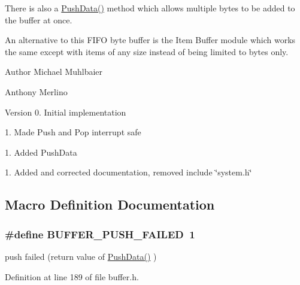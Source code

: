 There is also a \hyperlink{group__buffer_ga1a97e2269e9b21fc61b6e72ffdd2e374}{Push\+Data()} method which allows multiple bytes to be added to the buffer at once.

An alternative to this F\+I\+F\+O byte buffer is the Item Buffer module which works the same except with items of any size instead of being limited to bytes only.

\begin{DoxyAuthor}{Author}
Michael Muhlbaier 

Anthony Merlino
\end{DoxyAuthor}
\begin{DoxyVersion}{Version}
0. Initial implementation 

1. Made Push and Pop interrupt safe 

1. Added Push\+Data 

1. Added and corrected documentation, removed include \char`\"{}system.\+h\char`\"{} 
\end{DoxyVersion}


\subsection{Macro Definition Documentation}
\hypertarget{group__buffer_ga8b3828d728c4b468929da4c0a9ac421e}{}
\subsubsection[{B\+U\+F\+F\+E\+R\+\_\+\+P\+U\+S\+H\+\_\+\+F\+A\+I\+L\+E\+D}]{\setlength{\rightskip}{0pt plus 5cm}\#define B\+U\+F\+F\+E\+R\+\_\+\+P\+U\+S\+H\+\_\+\+F\+A\+I\+L\+E\+D~1}\label{group__buffer_ga8b3828d728c4b468929da4c0a9ac421e}


push failed (return value of \hyperlink{group__buffer_ga1a97e2269e9b21fc61b6e72ffdd2e374}{Push\+Data()} ) 



Definition at line 189 of file buffer.\+h.

\hypertarget{group__buffer_ga3fe3330725cee94f2c690f7e394a7cb0}{}
